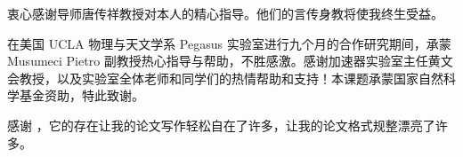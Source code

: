 \begin{acknowledgement}
  衷心感谢导师唐传祥教授对本人的精心指导。他们的言传身教将使我终生受益。

  在美国 UCLA 物理与天文学系 Pegasus 实验室进行九个月的合作研究期间，承蒙 Musumeci Pietro 副教授热心指导与帮助，不胜感激。感谢加速器实验室主任黄文会教授，以及实验室全体老师和同学们的热情帮助和支持！本课题承蒙国家自然科学基金资助，特此致谢。

  感谢 \thuthesis，它的存在让我的论文写作轻松自在了许多，让我的论文格式规整漂亮了许多。
\end{acknowledgement}
